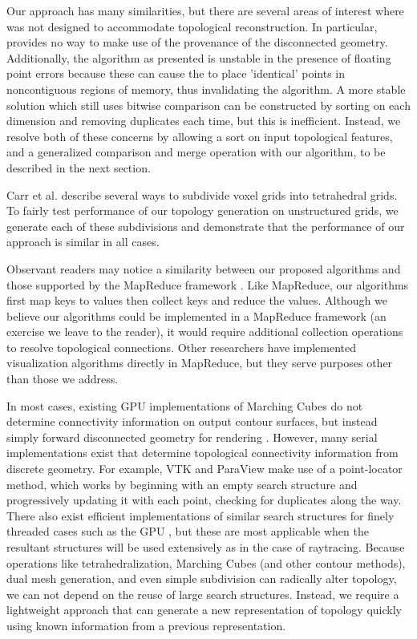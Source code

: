 \documentclass[10pt,journal,cspaper,compsoc]{IEEEtran}
\begin{document}
Our approach has many similarities, but there are several areas of interest where  was not designed to accommodate topological reconstruction. In particular,  provides no way to make use of the provenance of the disconnected geometry. Additionally, the  algorithm as presented is unstable in the presence of floating point errors because these can cause the  to place 'identical' points in noncontiguous regions of memory, thus invalidating the algorithm. A more stable solution which still uses bitwise comparison can be constructed by sorting on each dimension and removing duplicates each time, but this is inefficient. Instead, we resolve both of these concerns by allowing a sort on input topological features, and a generalized comparison and merge operation with our algorithm, to be described in the next section.

Carr et al. \cite{Carr2006} describe several ways to subdivide voxel grids into tetrahedral grids. To fairly test performance of our topology generation on unstructured grids, we generate each of these subdivisions and demonstrate that the performance of our approach is similar in all cases.

Observant readers may notice a similarity between our proposed algorithms and those supported by the MapReduce framework \cite{MapReduce}. Like MapReduce, our algorithms first map keys to values then collect keys and reduce the values. Although we believe our algorithms could be implemented in a MapReduce framework (an exercise we leave to the reader), it would require additional collection operations to resolve topological connections. Other researchers 
\cite{Stuart2010}\cite{Vo2011} have implemented visualization algorithms directly in MapReduce, but they serve purposes other than those we address.

In most cases, existing GPU implementations of Marching Cubes do not determine connectivity information on output contour surfaces, but instead simply forward disconnected geometry for rendering \cite{Dyken2008} \cite{Goetz_Junklewitz_Domik_2005} \cite{Johansson_Carr_2006}. However, many serial implementations exist that determine topological connectivity information from discrete geometry. For example, VTK and ParaView make use of a point-locator method, which works by beginning with an empty search structure and progressively updating it with each point, checking for duplicates along the way. There also exist efficient implementations of similar search structures for finely threaded cases such as the GPU \cite{Zhou_Hou_Wang_Guo_2008}, but these are most applicable when the resultant structures will be used extensively as in the case of raytracing. Because operations like tetrahedralization, Marching Cubes (and other contour methods), dual mesh generation, and even simple subdivision can radically alter topology, we can not depend on the reuse of large search structures. Instead, we require a lightweight approach that can generate a new representation of topology quickly using known information from a previous representation.
\end{document}
